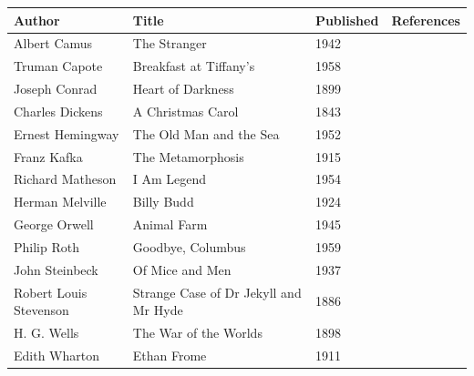 \documentclass{article}
\begin{document}
\begin{tabular}{llll}
\toprule
Author & Title & Published & References \\
\midrule
Albert Camus & The Stranger & 1942 &  \\
Truman Capote & Breakfast at Tiffany's & 1958 &  \\
Joseph Conrad & Heart of Darkness & 1899 &  \\
Charles Dickens & A Christmas Carol & 1843 &  \\
Ernest Hemingway & The Old Man and the Sea & 1952 &  \\
Franz Kafka & The Metamorphosis & 1915 &  \\
Richard Matheson & I Am Legend & 1954 &  \\
Herman Melville & Billy Budd & 1924 &  \\
George Orwell & Animal Farm & 1945 &  \\
Philip Roth & Goodbye, Columbus & 1959 &  \\
John Steinbeck & Of Mice and Men & 1937 &  \\
Robert Louis Stevenson & Strange Case of Dr Jekyll and Mr Hyde & 1886 &  \\
H. G. Wells & The War of the Worlds & 1898 &  \\
Edith Wharton & Ethan Frome & 1911 &  \\
\bottomrule
\end{tabular}
\end{document}
